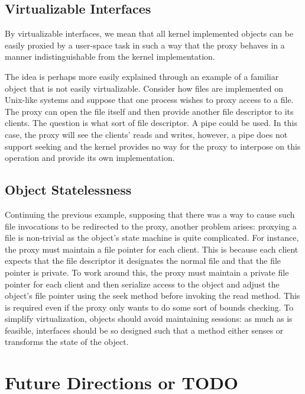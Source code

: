 \documentclass[12pt,a4paper]{book}
\begin{document}
\subsection{Virtualizable Interfaces}

By virtualizable interfaces, we mean that all kernel implemented
objects can be easily proxied by a user-space task in such a way that
the proxy behaves in a manner indistinguishable from the kernel
implementation.

The idea is perhaps more easily explained through an example of a
familiar object that is not easily virtualizable.  Consider how files
are implemented on Unix-like systems and suppose that one process
wishes to proxy access to a file.  The proxy can open the file itself
and then provide another file descriptor to its clients.  The question
is what sort of file descriptor.  A pipe could be used.  In this case,
the proxy will see the clients' reads and writes, however, a pipe does
not support seeking and the kernel provides no way for the proxy to
interpose on this operation and provide its own implementation.

\subsection{Object Statelessness}

Continuing the previous example, supposing that there was a way to
cause such file invocations to be redirected to the proxy, another
problem arises: proxying a file is non-trivial as the object's state
machine is quite complicated.  For instance, the proxy must maintain a
file pointer for each client.  This is because each client expects
that the file descriptor it designates the normal file and that the
file pointer is private.  To work around this, the proxy must maintain
a private file pointer for each client and then serialize access to
the object and adjust the object's file pointer using the seek method
before invoking the read method.  This is required even if the proxy
only wants to do some sort of bounds checking.  To simplify
virtualization, objects should avoid maintaining sessions: as much as
is feasible, interfaces should be so designed such that a method
either senses or transforms the state of the object.

\section{Future Directions or TODO}
\end{document}
